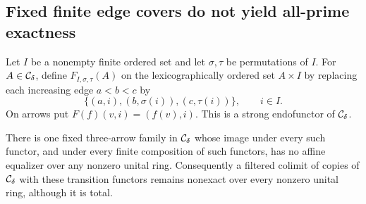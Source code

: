 \subsection{Fixed finite edge covers do not yield all-prime exactness}

\begin{proposition}
\label{C4:voltage-cover-exclusion}
Let $I$ be a nonempty finite ordered set and let $\sigma,\tau$
be permutations of $I$. For $A\in\mathcal C_\delta$, define
$F_{I,\sigma,\tau}(A)$ on the lexicographically ordered set
$A\times I$ by replacing each increasing edge $a<b<c$ by
\[
 \bigl\{(a,i),(b,\sigma(i)),(c,\tau(i))\bigr\},\qquad i\in I.
 \tag{COV.1}
\]
On arrows put $F(f)(v,i)=(f(v),i)$. This is a strong
endofunctor of $\mathcal C_\delta$.

There is one fixed three-arrow family in $\mathcal C_\delta$ whose
image under every such functor, and under every finite
composition of such functors, has no affine equalizer over
any nonzero unital ring. Consequently a filtered colimit of
copies of $\mathcal C_\delta$ with these transition functors remains
nonexact over every nonzero unital ring, although it is total.
\end{proposition}
